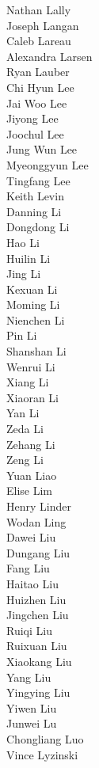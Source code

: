 Nathan Lally\\
Joseph Langan\\
Caleb Lareau\\
Alexandra Larsen\\
Ryan Lauber\\
Chi Hyun Lee\\
Jai Woo Lee\\
Jiyong Lee\\
Joochul Lee\\
Jung Wun Lee\\
Myeonggyun Lee\\
Tingfang Lee\\
Keith Levin\\
Danning Li\\
Dongdong Li\\
Hao Li\\
Huilin Li\\
Jing Li\\
Kexuan Li\\
Moming Li\\
Nienchen Li\\
Pin Li\\
Shanshan Li\\
Wenrui Li\\
Xiang Li\\
Xiaoran Li\\
Yan Li\\
Zeda Li\\
Zehang Li\\
Zeng Li\\
Yuan Liao\\
Elise Lim\\
Henry Linder\\
Wodan Ling\\
Dawei Liu\\
Dungang Liu\\
Fang Liu\\
Haitao Liu\\
Huizhen Liu\\
Jingchen Liu\\
Ruiqi Liu\\
Ruixuan Liu\\
Xiaokang Liu\\
Yang Liu\\
Yingying Liu\\
Yiwen Liu\\
Junwei Lu\\
Chongliang Luo\\
Vince Lyzinski\\
